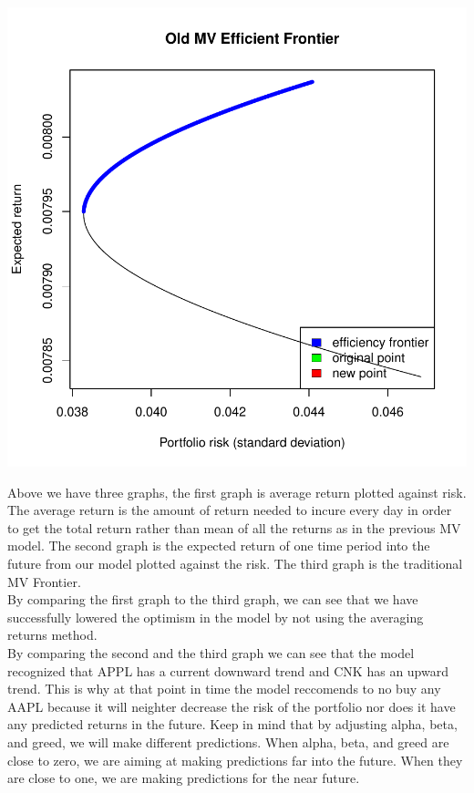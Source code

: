 \documentclass[english]{report}
\begin{document}
\includegraphics{MV_report-010}

\Large{\indent Above we have three graphs, the first graph is average return plotted against risk. The average return is the amount of return needed to incure every day in order to get the total return rather than mean of all the returns as in the previous MV model. The second graph is the expected return of one time period into the future from our model plotted against the risk. The third graph is the traditional MV Frontier.\\

By comparing the first graph to the third graph, we can see that we have successfully lowered the optimism in the model by not using the averaging returns method. \\
By comparing the second and the third graph we can see that the model recognized that APPL has a current downward trend and CNK has an upward trend. This is why at that point in time the model reccomends to no buy any AAPL because it will neighter decrease the risk of the portfolio nor does it have any predicted returns in the future. Keep in mind that by adjusting alpha, beta, and greed, we will make different predictions. When alpha, beta, and greed are close to zero, we are aiming at making predictions far into the future. When they are close to one, we are making predictions for the near future.}
\end{document}
